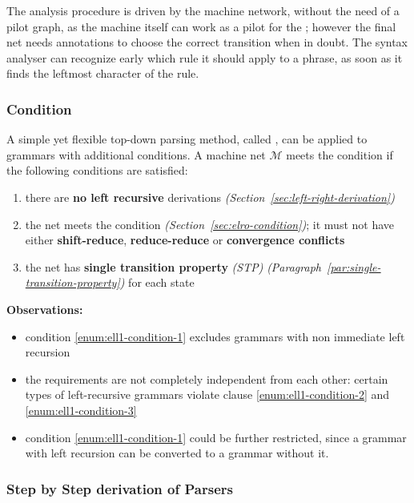 \documentclass[english]{article}
\begin{document}
\bigskip
The analysis procedure is driven by the machine network, without the need of a pilot graph, as the machine itself can work as a pilot for the \PDA;
however the final net needs annotations to choose the correct transition when in doubt.
The syntax analyser can recognize early which rule it should apply to a phrase, as soon as it finds the leftmost character of the rule.

\subsubsection[ELL(1) Condition]{\ello Condition}

A simple yet flexible top-down parsing method, called \ello, can be applied to \elro grammars with additional conditions.
A machine net \(\mathcal{M}\) meets the \ello condition if the following conditions are satisfied:

\begin{enumerate}[label=\arabic*., ref=(\arabic*)]
  \item\label{enum:ell1-condition-1} there are \textbf{no left recursive} derivations \textit{(Section~\ref{sec:left-right-derivation})}
  \item\label{enum:ell1-condition-2} the net meets the \elro condition \textit{(Section~\ref{sec:elro-condition})}; it must not have either \textbf{shift-reduce}, \textbf{reduce-reduce} or \textbf{convergence conflicts}
  \item\label{enum:ell1-condition-3} the net has \textbf{single transition property} \textit{(STP)} \textit{(Paragraph~\ref{par:single-transition-property})} for each state
\end{enumerate}

\bigskip
\textbf{Observations:}

\begin{itemize}
  \item condition \ref{enum:ell1-condition-1} excludes grammars with non immediate left recursion
  \item the requirements are not completely independent from each other: certain types of left-recursive grammars violate clause \ref{enum:ell1-condition-2} and \ref{enum:ell1-condition-3}
  \item condition \ref{enum:ell1-condition-1} could be further restricted, since a grammar with left recursion can be converted to a grammar without it.
\end{itemize}

\subsubsection[Step by Step derivation of ELL(1) Parsers]{Step by Step derivation of \ello Parsers}
\end{document}
